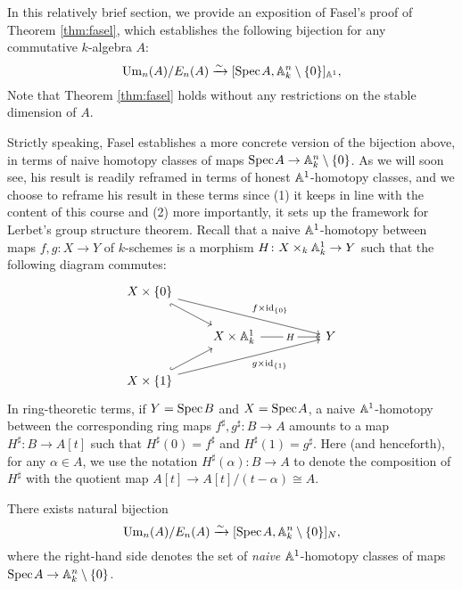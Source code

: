 In this relatively brief section, we provide an exposition of Fasel's proof of Theorem \ref{thm:fasel}, which establishes the following bijection for any commutative $k$-algebra $A$:
\[
\mathrm{Um}_n(A)/E_n(A) \xrightarrow{\sim} [\text{Spec}\hspace{0.1em} A, \mathbb{A}^n_k\setminus \{0\}]_{\mathbb{A}^1},
\]
Note that Theorem \ref{thm:fasel} holds without any restrictions on the stable dimension of $A$.

Strictly speaking, Fasel establishes a more concrete version of the bijection above, in terms of naive homotopy classes of maps $\text{Spec}\hspace{0.1em} A \to \mathbb{A}^n_k\setminus\{0\}$. As we will soon see, his result is readily reframed in terms of honest $\mathbb{A}^1$-homotopy classes, and we choose to reframe his result in these terms since (1) it keeps in line with the content of this course and (2) more importantly, it sets up the framework for Lerbet's group structure theorem. Recall that a naive $\mathbb{A}^1$-homotopy between maps $f,g\colon X \to Y$ of $k$-schemes is a morphism $H\colon X \times_k \mathbb{A}^1_k \to Y$ such that the following diagram commutes:
\[\begin{tikzcd}
	{X \times\{0\}} \\
	& {X \times\mathbb{A}^1_k} && Y \\
	{X \times \{1\}}
	\arrow[hook', from=1-1, to=2-2]
	\arrow["{f \times \operatorname{id}_{\{0\}}}", from=1-1, to=2-4]
	\arrow["H"{description}, from=2-2, to=2-4]
	\arrow[hook, from=3-1, to=2-2]
	\arrow["{g \times \operatorname{id}_{\{1\}}}"', from=3-1, to=2-4]
\end{tikzcd}\]
In ring-theoretic terms, if $Y = \text{Spec}\hspace{0.1em} B$ and $X = \text{Spec}\hspace{0.1em} A$, a naive $\mathbb{A}^1$-homotopy between the corresponding ring maps $f^\sharp, g^\sharp\colon B \to A$ amounts to a map $H^\sharp\colon B \to A[t]$ such that $H^\sharp(0) = f^\sharp$ and $H^\sharp(1) = g^\sharp$. Here (and henceforth), for any $\alpha \in A$, we use the notation $H^\sharp(\alpha)\colon B \to A$ to denote the composition of $H^\sharp$ with the quotient map $A[t] \to A[t]/(t - \alpha) \cong A$.

\begin{proposition}\cite[Theorem 2.1]{Fasel_2010}\label{prop:fasel_naive}
    There exists natural bijection
    \[
    \mathrm{Um}_n(A)/E_n(A) \xrightarrow{\sim} [\text{Spec}\hspace{0.1em} A, \mathbb{A}^n_k\setminus \{0\}]_{N},
    \]
    where the right-hand side denotes the set of \textit{naive} $\mathbb{A}^1$-homotopy classes of maps $\text{Spec}\hspace{0.1em} A \to \mathbb{A}^n_k \setminus\{0\}$. 
\end{proposition}

